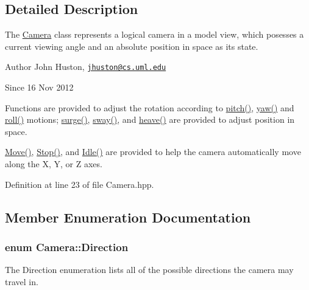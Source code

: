 \subsection{\-Detailed \-Description}
\-The \hyperlink{class_camera}{\-Camera} class represents a logical camera in a model view, which posesses a current viewing angle and an absolute position in space as its state. 

\begin{DoxyAuthor}{\-Author}
\-John \-Huston, \href{mailto:jhuston@cs.uml.edu}{\tt jhuston@cs.\-uml.\-edu} 
\end{DoxyAuthor}
\begin{DoxySince}{\-Since}
16 \-Nov 2012
\end{DoxySince}
\-Functions are provided to adjust the rotation according to \hyperlink{class_camera_ade9b499340749c916d6ffeeadd7296d4}{pitch()}, \hyperlink{class_camera_aea440eca8100cae6ffcc6ca915733795}{yaw()} and \hyperlink{class_camera_a6a0a10b821c733f380cc82aff09d9498}{roll()} motions; \hyperlink{class_camera_abb2251df65445bf8efd3fe0074fb5033}{surge()}, \hyperlink{class_camera_abbe6fe82ed05e64e35b0c4ed2001b34e}{sway()}, and \hyperlink{class_camera_a2148d751f104d8e39c9832e2372df2d9}{heave()} are provided to adjust position in space.

\hyperlink{class_camera_a421e03f93824e178d6e77ff547cd290e}{\-Move()}, \hyperlink{class_camera_adf064f765f610684e0675bd67de013fd}{\-Stop()}, and \hyperlink{class_camera_aec3559fe43597656629fdb00157d3c73}{\-Idle()} are provided to help the camera automatically move along the \-X, \-Y, or \-Z axes. 

\-Definition at line 23 of file \-Camera.\-hpp.



\subsection{\-Member \-Enumeration \-Documentation}
\hypertarget{class_camera_a80cb65605322d27ad3b6d973484509ec}{
\subsubsection[{\-Direction}]{\setlength{\rightskip}{0pt plus 5cm}enum {\bf \-Camera\-::\-Direction}}}\label{class_camera_a80cb65605322d27ad3b6d973484509ec}


\-The \-Direction enumeration lists all of the possible directions the camera may travel in. 

